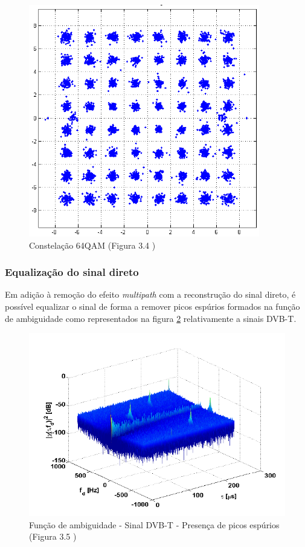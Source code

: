 \begin{figure}[h]
\centering
\includegraphics[scale=0.7]{chapters/ch4/assets/64QAM}
\caption[Constelação 64QAM]{Constelação 64QAM (Figura 3.4 \cite{Martorella})}
\label{fig:64QAM}
\end{figure}


\subsubsection*{Equalização do sinal direto}
Em adição à remoção do efeito \textit{multipath} com a reconstrução do sinal direto, é possível equalizar o sinal de forma a remover picos espúrios formados na função de ambiguidade como representados na figura \ref{fig:ACF} relativamente a sinais \gls{DVB-T}.

\begin{figure}[h]
\centering
\includegraphics[scale=0.7]{chapters/ch4/assets/ACF}
\caption[Função de ambiguidade - Sinal DVB-T]{Função de ambiguidade - Sinal DVB-T - Presença de picos espúrios (Figura 3.5 \cite{Martorella})}
\label{fig:ACF}
\end{figure}

